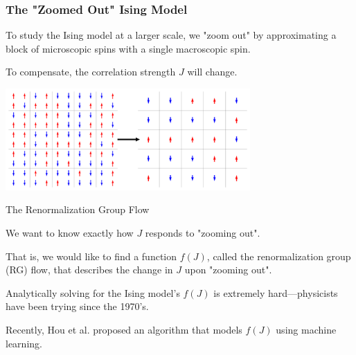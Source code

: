 \documentclass[aspectratio=169, 12pt]{beamer}
\begin{document}
\begin{frame}

    \frametitle{The "Zoomed Out" Ising Model}

    To study the Ising model at a larger scale, we "zoom out" by approximating a block of microscopic spins with a single macroscopic spin. 

    \vspace{1em}

    To compensate, the correlation strength $J$ will change. 
    
    \begin{center}
        \includegraphics[width=0.7\textwidth]{images/ising-blocking.png}
    \end{center}

\end{frame}

\begin{frame}{The Renormalization Group Flow}

    We want to know exactly how $J$ responds to "zooming out". 

    \vspace{1em}

    That is, we would like to find a function $f(J)$, called the renormalization group (RG) flow, that describes the change in $J$ upon "zooming out". 

    \vspace{1em}

    Analytically solving for the Ising model's $f(J)$ is extremely hard—physicists have been trying since the 1970's. 

    \vspace{1em}

    Recently, Hou et al. proposed an algorithm that models $f(J)$ using machine learning. 
    
\end{frame}
\end{document}
